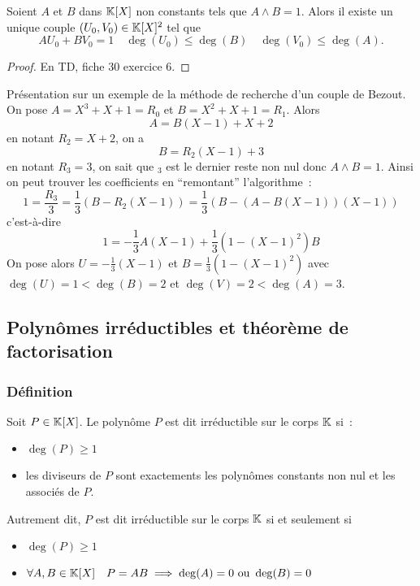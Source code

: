 \begin{prop}
  Soient $A$ et $B$ dans $\mathbb{K}[X]$ non constants tels que $A\wedge B=1$. Alors il existe un unique couple $(U_0,V_0) \in \mathbb{K}[X]^2$ tel que
  \begin{equation}
    AU_0+BV_0 = 1 \quad \deg(U_0) \leqslant \deg(B) \quad \deg(V_0) \leqslant \deg(A).
  \end{equation}
\end{prop}
\begin{proof}
  En TD, fiche 30 exercice 6.
\end{proof}

Présentation sur un exemple de la méthode de recherche d'un couple de Bezout. On pose $A=X^3+X+1=R_0$ et $B=X^2+X+1=R_1$. Alors
\begin{equation}
  A=B(X-1)+X+2
\end{equation}
en notant $R_2=X+2$, on a
\begin{equation}
  B=R_2(X-1)+3
\end{equation}
en notant $R_3=3$, on sait que $_3$ est le dernier reste non nul donc $A\wedge B=1$. Ainsi on peut trouver les coefficients en ``remontant'' l'algorithme~:
\begin{equation}
  1 = \frac{R_3}{3} = \frac{1}{3}(B-R_2(X-1)) = \frac{1}{3}(B-(A-B(X-1))(X-1))
\end{equation}
c'est-à-dire
\begin{equation}
  1 = -\frac{1}{3} A(X-1) + \frac{1}{3}(1-(X-1)^2)B
\end{equation}
On pose alors $U=-\frac{1}{3}(X-1)$ et $B=\frac{1}{3}(1-(X-1)^2)$ avec $\deg(U)=1 < \deg(B)=2$ et $\deg(V)=2 < \deg(A)=3$.

\subsection{Polynômes irréductibles et théorème de factorisation}

\subsubsection{Définition}

\begin{defdef}
  Soit $P \in \mathbb{K}[X]$. Le polynôme $P$ est dit irréductible sur le corps $\mathbb{K}$ si~:
  \begin{itemize}
  \item $\deg(P) \geqslant 1$
  \item les diviseurs de $P$ sont exactements les polynômes constants non nul et les associés de $P$.
  \end{itemize}
  Autrement dit, $P$ est dit irréductible sur le corps $\mathbb{K}$ si et seulement si
  \begin{itemize}
  \item $\deg(P) \geqslant 1$
  \item $\forall A,B \in \mathbb{K}[X] \quad P=AB \implies \deg(A)=0 \text{~ou~} \deg(B)=0$
  \end{itemize}
\end{defdef}

